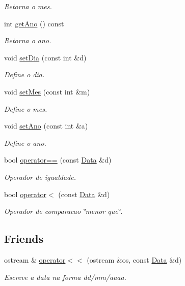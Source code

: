 \begin{DoxyCompactItemize}
\begin{DoxyCompactList}\small\item\em Retorna o mes. \end{DoxyCompactList}\item 
int \hyperlink{class_data_a986bec10cbca338f08c9096d8e51efb5}{get\+Ano} () const
\begin{DoxyCompactList}\small\item\em Retorna o ano. \end{DoxyCompactList}\item 
void \hyperlink{class_data_ae417bf0daa0cd736be446ebac4a18589}{set\+Dia} (const int \&d)
\begin{DoxyCompactList}\small\item\em Define o dia. \end{DoxyCompactList}\item 
void \hyperlink{class_data_a296b98388435fff3677ab220c7e070da}{set\+Mes} (const int \&m)
\begin{DoxyCompactList}\small\item\em Define o mes. \end{DoxyCompactList}\item 
void \hyperlink{class_data_a84dbaee286db7c5c6039ea97d6293d53}{set\+Ano} (const int \&a)
\begin{DoxyCompactList}\small\item\em Define o ano. \end{DoxyCompactList}\item 
bool \hyperlink{class_data_ae4c00338b1d73e12dc177b48d7b04d89}{operator==} (const \hyperlink{class_data}{Data} \&d)
\begin{DoxyCompactList}\small\item\em Operador de igualdade. \end{DoxyCompactList}\item 
bool \hyperlink{class_data_a5f305274d7f60e8f1208dbd623ed4e71}{operator$<$} (const \hyperlink{class_data}{Data} \&d)
\begin{DoxyCompactList}\small\item\em Operador de comparacao \char`\"{}menor que\char`\"{}. \end{DoxyCompactList}\end{DoxyCompactItemize}
\subsection*{Friends}
\begin{DoxyCompactItemize}
\item 
ostream \& \hyperlink{class_data_a610a7c48e852afcc4874e1d5f0ed8f96}{operator$<$$<$} (ostream \&os, const \hyperlink{class_data}{Data} \&d)
\begin{DoxyCompactList}\small\item\em Escreve a data na forma dd/mm/aaaa. \end{DoxyCompactList}\end{DoxyCompactItemize}


